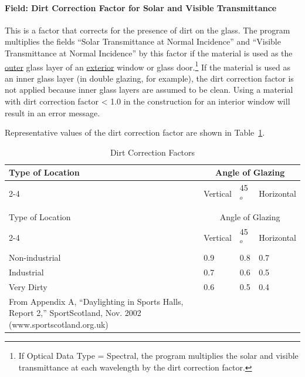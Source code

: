 \paragraph{Field: Dirt Correction Factor for Solar and Visible Transmittance}\label{field-dirt-correction-factor-for-solar-and-visible-transmittance}

This is a factor that corrects for the presence of dirt on the glass. The program multiplies the fields ``Solar Transmittance at Normal Incidence'' and ``Visible Transmittance at Normal Incidence'' by this factor if the material is used as the \underline{outer} glass layer of an \underline{exterior} window or glass door.\footnote{If Optical Data Type = Spectral, the program multiplies the solar and visible transmittance at each wavelength by the dirt correction factor.} If the material is used as an inner glass layer (in double glazing, for example), the dirt correction factor is not applied because inner glass layers are assumed to be clean. Using a material with dirt correction factor \textless{} 1.0 in the construction for an interior window will result in an error message.

Representative values of the dirt correction factor are shown in Table~\ref{table:dirt-correction-factors}.

\begin{longtable}[c]{@{}llll@{}}
\caption{Dirt Correction Factors \label{table:dirt-correction-factors}} \\
\toprule
Type of Location & \multicolumn{3}{c}{Angle of Glazing} \\ \cmidrule(r){2-4}
                 & Vertical & 45$^{o}$ & Horizontal \\ \midrule
\endfirsthead

\caption[]{Dirt Correction Factors} \\
\toprule
Type of Location & \multicolumn{3}{c}{Angle of Glazing} \\ \cmidrule(r){2-4}
                 & Vertical & 45$^{o}$ & Horizontal \\ \midrule
\endhead

Non-industrial & 0.9 & 0.8 & 0.7 \\
Industrial & 0.7 & 0.6 & 0.5 \\
Very Dirty & 0.6 & 0.5 & 0.4 \\
\bottomrule
{\tiny From Appendix A, ``Daylighting in Sports Halls, Report 2,'' SportScotland, Nov. 2002 (www.sportscotland.org.uk)}
\end{longtable}

